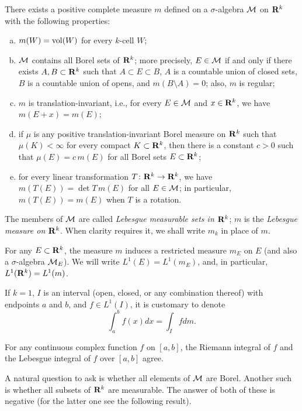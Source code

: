 \begin{theorem}
  There exists a positive complete measure $m$ defined on a $\sigma$-algebra $\mathcal{M}$ on $\mathbf{R}^k$ with the following properties:
  \begin{enumerate}[(a)]
  \item $m(W) = \operatorname{vol}(W)$ for every $k$-cell $W$;
  \item $\mathcal{M}$ contains all Borel sets of $\mathbf{R}^k$; more precisely, $E \in \mathcal{M}$ if and only if there exists $A,B \subset \mathbf{R}^k$ such that $A \subset E \subset B$, $A$ is a countable union of closed sets, $B$ is a countable union of opens, and $m(B \setminus A) = 0$; also, $m$ is regular;
  \item $m$ is translation-invariant, i.e., for every $E \in \mathcal{M}$ and $x \in \mathbf{R}^k$, we have $m(E+x) = m(E)$;
  \item if $\mu$ is any positive translation-invariant Borel measure on $\mathbf{R}^k$ such that $\mu(K) < \infty$ for every compact $K \subset \mathbf{R}^k$, then there is a constant $c > 0$ such that $\mu(E) = c \, m(E)$ for all Borel sets $E \subset \mathbf{R}^k$;
  \item for every linear transformation $T \colon \mathbf{R}^k \rightarrow \mathbf{R}^k$, we have $m(T(E)) = \det T \, m(E)$ for all $E \in \mathcal{M}$; in particular, $m(T(E)) = m(E)$ when $T$ is a rotation.
  \end{enumerate}
\end{theorem}

\begin{definition}
  The members of $\mathcal{M}$ are called \emph{Lebesgue measurable sets in $\mathbf{R}^k$}; $m$ is the \emph{Lebesgue measure on $\mathbf{R}^k$}. When clarity requires it, we shall write $m_k$ in place of $m$.

  For any $E \subset \mathbf{R}^k$, the measure $m$ induces a restricted measure $m_E$ on $E$ (and also a $\sigma$-algebra $\mathcal{M}_E$). We will write $L^1(E) = L^1(m_E)$, and, in particular, $L^1(\mathbf{R}^k) = L^1(m)$.

  If $k = 1$, $I$ is an interval (open, closed, or any combination thereof) with endpoints $a$ and $b$, and $f \in L^1(I)$, it is customary to denote
  \[
  \int_a^b f(x) d x = \int_I f d m.
  \]
\end{definition}

\begin{proposition}
  For any continuous complex function $f$ on $[a,b]$, the Riemann integral of $f$ and the Lebesgue integral of $f$ over $[a,b]$ agree.
\end{proposition}

\begin{remark}
  A natural question to ask is whether all elements of $\mathcal{M}$ are Borel. Another such is whether all subsets of $\mathbf{R}^k$ are measurable. The answer of both of these is negative (for the latter one see the following result).
\end{remark}


